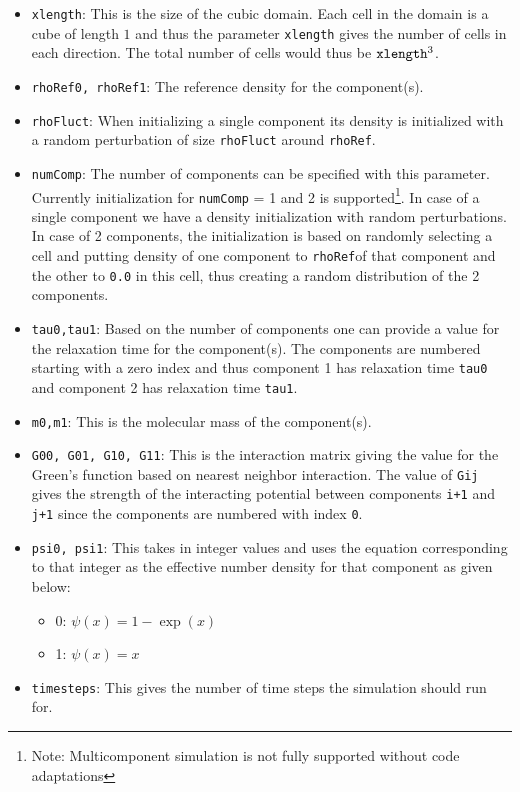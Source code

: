 \documentclass[11pt]{article}
\begin{document}
\begin{itemize}
	\item \verb|xlength|: This is the size of the cubic domain. Each cell in the domain is a cube of length $1$ and thus the parameter \verb|xlength| gives the number of cells in each direction. The total number of cells would thus be $\verb|xlength|^3$.
    \item \verb|rhoRef0, rhoRef1|:  The reference density for the component(s).
    \item \verb|rhoFluct|: When initializing a single component its density is initialized with a random perturbation of size \verb|rhoFluct| around \verb|rhoRef|.
    \item \verb|numComp|: The number of components can be specified with this parameter. Currently initialization for \verb|numComp| = 1 and 2 is supported\footnote{Note: Multicomponent simulation is not fully supported without code adaptations}. In case of a single component we have a density initialization with random perturbations. In case of 2 components, the initialization is based on randomly selecting a cell and putting density of one component to \verb|rhoRef|of that component and the other to \verb|0.0| in this cell, thus creating a random distribution of the 2 components.
	\item \verb|tau0,tau1|: Based on the number of components one can provide a value for the relaxation time for the component(s). The components are numbered starting with a zero index and thus component 1 has relaxation time \verb|tau0| and component 2 has relaxation time \verb|tau1|.
	\item \verb|m0,m1|: This is the molecular mass of the component(s).
	\item \verb|G00, G01, G10, G11|: This is the interaction matrix giving the value for the Green's function based on nearest neighbor interaction. The value of \verb|Gij| gives the strength of the interacting potential between components \verb|i+1| and \verb|j+1| since the components are numbered with index \verb|0|.
	\item \verb|psi0, psi1|: This takes in integer values and uses the equation corresponding to that integer as the effective number density for that component as given below:
	\begin{itemize}
		\item 0: $\psi(x) = 1-\exp(x)$
		\item 1: $\psi(x) = x$
	\end{itemize}
	\item \verb|timesteps|: This gives the number of time steps the simulation should run for.

\end{itemize}
\end{document}
